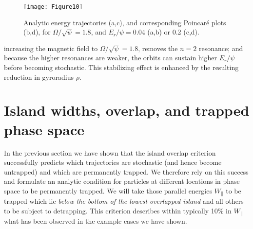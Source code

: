 \documentclass{agujournal2019}
\begin{document}
\begin{figure}
\else
\texttt{[image: Figure10]}
\fi
  \caption{Analytic energy trajectories (a,c), and corresponding
    Poincar\'e plots (b,d), for $\Omega/\sqrt{\psi}=1.8$, and
    $E_r/\psi=0.04$ (a,b) or 0.2 (c,d).}
  \label{fig:traj1840}
\end{figure}
increasing the magnetic field to
$\Omega/\sqrt{\psi}=1.8$, removes the $n=2$ resonance; and because the
higher resonances are weaker, the orbits can sustain higher $E_r/\psi$
before becoming stochastic. This stabilizing effect is enhanced by the resulting
reduction in gyroradius $\rho$.



\section{Island widths,  overlap, and trapped phase space}

In the previous section we have shown that the island overlap
criterion successfully predicts which trajectories are stochastic (and
hence become untrapped) and which are permanently trapped. We
therefore rely on this success and formulate an analytic condition for
particles at different locations in phase space to be permanently
trapped. We will take those parallel energies $W_\parallel$ to be
trapped which lie \emph{below the bottom of the lowest overlapped
  island} and all others to be subject to detrapping. This criterion
describes within typically 10\% in $W_\parallel$ what has been
observed in the example cases we have shown.
\end{document}
